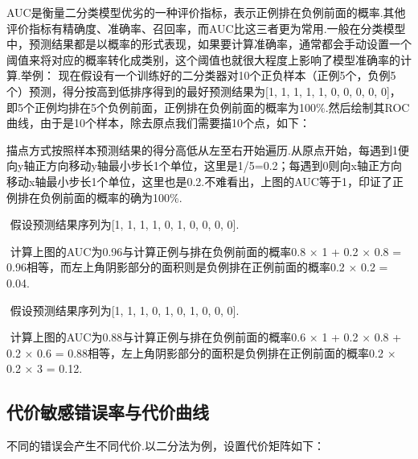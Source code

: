 ​
AUC是衡量二分类模型优劣的一种评价指标，表示正例排在负例前面的概率.其他评价指标有精确度、准确率、召回率，而AUC比这三者更为常用.
​
一般在分类模型中，预测结果都是以概率的形式表现，如果要计算准确率，通常都会手动设置一个阈值来将对应的概率转化成类别，这个阈值也就很大程度上影响了模型准确率的计算.
​ 举例： ​
现在假设有一个训练好的二分类器对10个正负样本（正例5个，负例5个）预测，得分按高到低排序得到的最好预测结果为{[}1,
1, 1, 1, 1, 0, 0, 0, 0,
0{]}，即5个正例均排在5个负例前面，正例排在负例前面的概率为100\%.然后绘制其ROC曲线，由于是10个样本，除去原点我们需要描10个点，如下：


​
描点方式按照样本预测结果的得分高低从左至右开始遍历.从原点开始，每遇到1便向y轴正方向移动y轴最小步长1个单位，这里是1/5=0.2；每遇到0则向x轴正方向移动x轴最小步长1个单位，这里也是0.2.不难看出，上图的AUC等于1，印证了正例排在负例前面的概率的确为100\%.

​ 假设预测结果序列为{[}1, 1, 1, 1, 0, 1, 0, 0, 0, 0{]}.


​ 计算上图的AUC为0.96与计算正例与排在负例前面的概率0.8 × 1 + 0.2 × 0.8 =
0.96相等，而左上角阴影部分的面积则是负例排在正例前面的概率0.2 × 0.2 =
0.04.

​ 假设预测结果序列为{[}1, 1, 1, 0, 1, 0, 1, 0, 0, 0{]}.

 

​ 计算上图的AUC为0.88与计算正例与排在负例前面的概率0.6 × 1 + 0.2 × 0.8 +
0.2 × 0.6 = 0.88相等，左上角阴影部分的面积是负例排在正例前面的概率0.2 ×
0.2 × 3 = 0.12.

\subsection{代价敏感错误率与代价曲线}\label{ux4ee3ux4ef7ux654fux611fux9519ux8befux7387ux4e0eux4ee3ux4ef7ux66f2ux7ebf}

不同的错误会产生不同代价.以二分法为例，设置代价矩阵如下：


